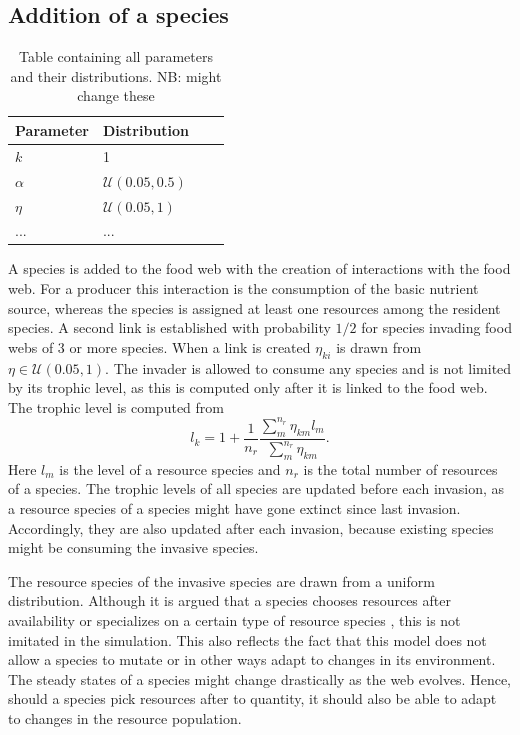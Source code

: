\subsection{Addition of a species}
\begin{table}[width=.9\linewidth, cols=2, pos=h]
    \caption{Table containing all parameters and their distributions. NB: might change these}
    \label{TBL:parameters}
    \begin{tabular*}{\tblwidth}{L@{} LLL@{} }
        \toprule
        Parameter & Distribution \\
        \midrule
        $k$ & 1 \\
        $\alpha$ & $\mathcal{U}(0.05, 0.5)$ \\
        $\eta$ & $\mathcal{U}(0.05, 1)$ \\
        ... & ...\\
        \bottomrule
    \end{tabular*}
\end{table}
A species is added to the food web with the creation of interactions with the food web. For a producer this interaction is the consumption of the basic nutrient source, whereas the species is assigned at least one resources among the resident species.
A second link is established with probability $1/2$ for species invading food webs of $3$ or more species. When a link is created $\eta_{ki}$ is drawn from $\eta \in \mathcal{U}(0.05, 1)$.
The invader is allowed to consume any species and is not limited by its trophic level, as this is computed only after it is linked to the food web. The trophic level is computed from
\begin{equation}
    l_k = 1 + \frac{1}{n_{r}}\frac{\sum_m^{n_{r}} \eta_{km}l_m}{\sum_m^{n_{r}} \eta_{km}}.
    \label{eq:l}
\end{equation}
Here $l_m$ is the level of a resource species and $n_{r}$ is the total number of resources of a species. 
The trophic levels of all species are updated before each invasion, as a resource species of a species might have gone extinct since last invasion. Accordingly, they are also updated after each invasion, because existing species might be consuming the invasive species. 

The resource species of the invasive species are drawn from a uniform distribution. 
Although it is argued that a species chooses resources after availability or specializes on a certain type of resource species \cite{sih1990interacting}, this is not imitated in the simulation.
This also reflects the fact that this model does not allow a species to mutate or in other ways adapt to changes in its environment. 
The steady states of a species might change drastically as the web evolves. 
Hence, should a species pick resources after to quantity, it should also be able to adapt to changes in the resource population.
